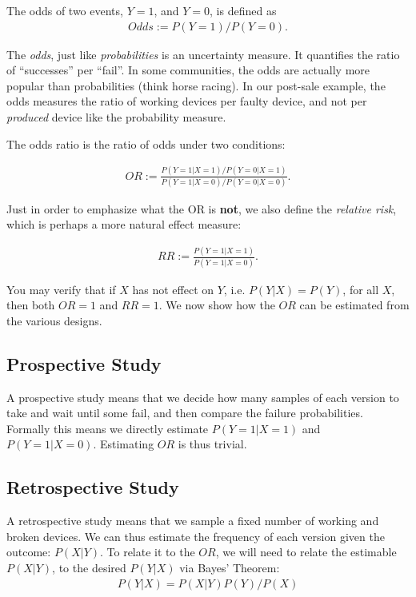 \begin{definition}[Odds]
	The odds of two events, $Y=1$, and $Y=0$, is defined as 
	\begin{align}
	Odds:= P(Y=1)/P(Y=0).
	\end{align}
\end{definition}
The \emph{odds}, just like \emph{probabilities} is an uncertainty measure. 
It quantifies the ratio of ``successes'' per ``fail''. 
In some communities, the odds are actually more popular than probabilities (think horse racing).
In our post-sale example, the odds measures the ratio of working devices per faulty device, and not per \emph{produced} device like the probability measure. 



The odds ratio is the ratio of odds under two conditions: 
\begin{definition}
	\begin{align}
	OR := \frac{P(Y=1|X=1) / P(Y=0|X=1)}{P(Y=1|X=0) / P(Y=0|X=0)}.
	\end{align}
\end{definition}
Just in order to emphasize what the OR is \textbf{not}, we also define the \emph{relative risk}, which is perhaps a more natural effect measure:
\begin{definition}
	\begin{align}
	RR := \frac{P(Y=1|X=1)}{P(Y=1|X=0)}.
	\end{align}
\end{definition}
You may verify that if $X$ has not effect on $Y$, i.e. $P(Y|X)=P(Y)$, for all $X$, then both $OR=1$ and $RR=1$. 
We now show how the $OR$ can be estimated from the various designs. 


\subsection{Prospective Study} 
A prospective study means that we decide how many samples of each version to take and wait until some fail, and then compare the failure probabilities. 
Formally this means we directly estimate $P(Y=1|X=1)$ and $P(Y=1|X=0)$.
Estimating $OR$ is thus trivial.






\subsection{Retrospective Study}
A retrospective study means that we sample a fixed number of working and broken devices. 
We can thus estimate the frequency of each version given the outcome: $P(X|Y)$.
To relate it to the $OR$, we will need to relate the estimable $P(X|Y)$, to the desired $P(Y|X)$ via Bayes' Theorem: 
\begin{align}
\label{eq:bayes}
	P(Y|X)=P(X|Y)P(Y)/P(X)
\end{align}

